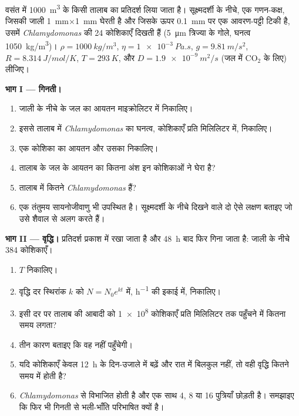 \begin{problem}
\label{pb:b2:unicellular-diversity:1}
वसंत में \qty{1000}{m^3} के किसी तालाब का प्रतिदर्श लिया जाता है।
सूक्ष्मदर्शी के नीचे, एक गणन-कक्ष, जिसकी जाली \qty{1}{mm}$\times$\qty{1}{mm}
घेरती है और जिसके ऊपर \qty{0.1}{mm} पर एक आवरण-पट्टी टिकी है, उसमें
\emph{Chlamydomonas} की 24 कोशिकाएँ दिखती हैं (\qty{5}{\micro m}
त्रिज्या के गोले, घनत्व \qty{1050}{kg/m^3})। $\rho = \qty{1000}{kg/m^3}$,
$\eta = \qty{1e-3}{Pa.s}$, $g = \qty{9.81}{m/s^2}$, $R =
\qty{8.314}{J/mol/K}$, $T = \qty{293}{K}$, और $D = \qty{1.9e-9}{m^2/s}$
(जल में $\mathrm{CO_2}$ के लिए) लीजिए।

\medskip
\noindent\textbf{भाग I --- गिनती।}
\begin{enumerate}
  \item जाली के नीचे के जल का आयतन माइक्रोलिटर में निकालिए।
  \item इससे तालाब में \emph{Chlamydomonas} का घनत्व, कोशिकाएँ प्रति
        मिलिलिटर में, निकालिए।
  \item एक कोशिका का आयतन और उसका  निकालिए।
  \item तालाब के जल के आयतन का कितना अंश इन कोशिकाओं ने घेरा है?
  \item तालाब में कितने \emph{Chlamydomonas} हैं?
  \item एक तंतुमय सायनोजीवाणु भी उपस्थित है। सूक्ष्मदर्शी के नीचे दिखने
        वाले दो ऐसे लक्षण बताइए जो उसे शैवाल से अलग करते हैं।
\end{enumerate}

\medskip
\noindent\textbf{भाग II --- वृद्धि।}
प्रतिदर्श प्रकाश में रखा जाता है और \qty{48}{h} बाद फिर गिना जाता है:
जाली के नीचे \num{384} कोशिकाएँ।
\begin{enumerate}[resume]
  \item {} $T$ निकालिए।
  \item वृद्धि दर स्थिरांक $k$ को $N = N_0 e^{kt}$ में, \unit{h^{-1}} की
        इकाई में, निकालिए।
  \item इसी दर पर तालाब की आबादी को \qty{1e8}{} कोशिकाएँ प्रति मिलिलिटर
        तक पहुँचने में कितना समय लगता?
  \item तीन कारण बताइए कि वह नहीं पहुँचेगी।
  \item यदि कोशिकाएँ केवल \qty{12}{h} के दिन-उजाले में बढ़ें और रात में
        बिलकुल नहीं, तो वही वृद्धि कितने समय में होती है?
  \item \emph{Chlamydomonas}  से विभाजित होती है और एक साथ
        4, 8 या 16 पुत्रियाँ छोड़ती है। समझाइए कि फिर भी गिनती से  भली-भाँति परिभाषित क्यों है।
\end{enumerate}


\end{problem}
